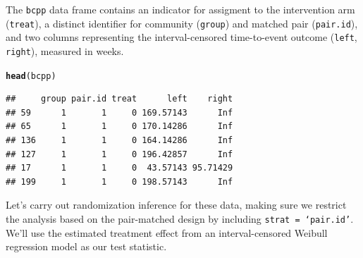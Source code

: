\documentclass[12pt]{article}\usepackage[]{graphicx}\usepackage[]{color}
\makeatletter
\newcommand{\hlstd}[1]{\textcolor[rgb]{0.345,0.345,0.345}{#1}}%
\newcommand{\hlkwd}[1]{\textcolor[rgb]{0.737,0.353,0.396}{\textbf{#1}}}%
\newenvironment{kframe}{%
 \def\at@end@of@kframe{}%
 \ifinner\ifhmode%
  \def\at@end@of@kframe{\end{minipage}}%
  \begin{minipage}{\columnwidth}%
 \fi\fi%
 \def\FrameCommand##1{\hskip\@totalleftmargin \hskip-\fboxsep
 \colorbox{shadecolor}{##1}\hskip-\fboxsep
     \hskip-\linewidth \hskip-\@totalleftmargin \hskip\columnwidth}%
 \MakeFramed {\advance\hsize-\width
   \@totalleftmargin\z@ \linewidth\hsize
   \@setminipage}}%
 {\par\unskip\endMakeFramed%
 \at@end@of@kframe}
\newenvironment{knitrout}{}{} %
\makeatother
\begin{document}
The \texttt{bcpp} data frame contains an indicator for assigment to the intervention arm (\texttt{treat}), a distinct identifier for community (\texttt{group}) and matched pair (\texttt{pair.id}), and two columns representing the interval-censored time-to-event outcome (\texttt{left}, \texttt{right}), measured in weeks.
\begin{knitrout}
\color{fgcolor}\begin{kframe}
\begin{alltt}
\hlkwd{head}\hlstd{(bcpp)}
\end{alltt}
\begin{verbatim}
##     group pair.id treat      left    right
## 59      1       1     0 169.57143      Inf
## 65      1       1     0 170.14286      Inf
## 136     1       1     0 164.14286      Inf
## 127     1       1     0 196.42857      Inf
## 17      1       1     0  43.57143 95.71429
## 199     1       1     0 198.57143      Inf
\end{verbatim}
\end{kframe}
\end{knitrout}
Let's carry out randomization inference for these data, making sure we restrict the analysis based on the pair-matched design by including \texttt{strat = `pair.id'}. We'll use the estimated treatment effect from an interval-censored Weibull regression model as our test statistic.
\end{document}
